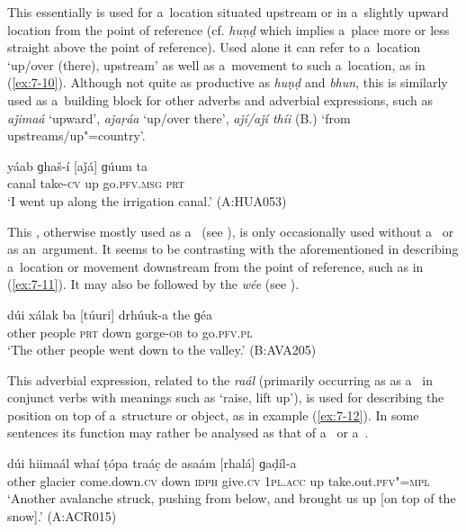  This essentially   is used for a~location situated upstream or in a~slightly upward location from the point of reference (cf. \textit{huṇḍ} which implies a~place more or less straight above the point of reference). Used alone it can refer to a~location `up/over (there), upstream' as well as a~movement to such a~location, as in (\ref{ex:7-10}). Although not quite as productive as \textit{huṇḍ} and \textit{bhun}, this  is similarly used as a~building block for other adverbs and adverbial expressions, such as \textit{aǰimaá} `upward', \textit{aǰaṛáa} `up/over there', \textit{aǰí/aǰí thíi} (B.) `from upstreams/up"=country'.

\begin{exe}
\ex
\label{ex:7-10}
\gll yáab ɡhaš-í [aǰá] ɡúum ta  \\
canal take-\textsc{cv} up go.\textsc{pfv.msg} \textsc{prt} \\
\glt `I went up along the irrigation canal.' (A:HUA053)
\end{exe}

 This , otherwise mostly used as a~ (see ), is only occasionally used without a~ or  as an~argument. It seems to be contrasting with the aforementioned  in describing a~location or movement downstream from the point of reference, such as in (\ref{ex:7-11}). It may also be followed by the  \textit{wée} (see ). 

\begin{exe}
\ex
\label{ex:7-11}
\gll dúi xálak ba [túuri] drhúuk-a the ɡéa  \\
other people \textsc{prt} down gorge-\textsc{ob}  to go.\textsc{pfv.pl} \\
\glt `The other people went down to the valley.' (B:AVA205)
\end{exe}

 This adverbial expression, related to the  \textit{raál} (primarily occurring as as a~ in conjunct verbs with meanings such as `raise, lift up'), is used for describing the position on top of a~structure or object, as in example (\ref{ex:7-12}). In some sentences its function may rather be analysed as that of a~ or a~.

\begin{exe}
\ex
\label{ex:7-12}
\gll dúi hiimaál whaí ṭópa traác̣ de asaám  [rhalá] ɡaḍíl-a\\
other glacier come.down.\textsc{cv} down \textsc{idph} give.\textsc{cv} \textsc{1pl.acc} up take.out.\textsc{pfv"=mpl}\\
\glt `Another avalanche struck, pushing from below, and brought us up [on top of the snow].' (A:ACR015)
\end{exe}

